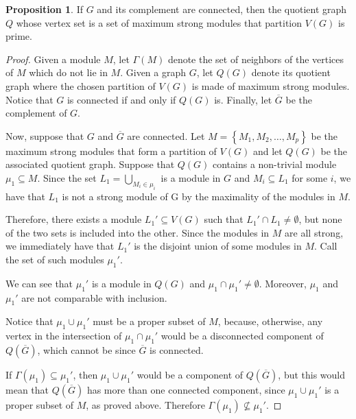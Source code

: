 \documentclass{article}
\theoremstyle{definition}
\newtheorem{prop}[thm]{Proposition}
\begin{document}
    \begin{prop} \label{prime quotient}
        If $G$ and its complement are connected, 
        then the quotient graph  $Q$ whose vertex set is
        a set of maximum strong modules that partition $V\left(G\right)$ is prime.
    \end{prop}
    \begin{proof}
        Given a module $M$, let $\Gamma\left(M\right)$ denote
        the set of neighbors of the vertices of $M$ 
        which do not lie in $M$.
        Given a graph  $G$, let  $Q\left(G\right)$ denote
        its quotient graph  where the chosen partition of
        $V\left(G\right)$ is made of maximum strong modules.
        Notice that $G$ is connected if and only if $Q\left(G\right)$ is.
        Finally, let $\overline{G}$ be the complement of $G$.

        Now, suppose that $G$ and $\overline{G}$ are connected.
        Let $M = \left\{M_1, M_2, \ldots, M_{p}\right\}$
        be the maximum strong modules that form a partition of $V\left(G\right)$
        and let $Q\left(G\right)$ be the associated quotient graph.
        Suppose that $Q\left(G\right)$ contains a non-trivial module
        $\mu_1 \subseteq M$. Since the set $L_1 = \bigcup_{M_{i} \in \mu_{i}}$
        is a module in $G$ and $M_{i} \subseteq L_1$ for some $i$,
        we have that $L_1$ is not a strong module of G
        by the maximality of the modules in $M$.

        Therefore, there exists a module $L_1' \subseteq V\left(G\right)$
        such that $L_1' \cap L_1 \neq \emptyset$, 
        but none of the two sets is included into the other.
        Since the modules in $M$ are all strong,
        we immediately have that $L_1'$ is the disjoint union of some modules in $M$.
        Call the set of such modules $\mu_1'$.

        We can see that $\mu_1'$ is a module in $Q\left(G\right)$ and 
        $\mu_1 \cap \mu_1' \neq \emptyset$.
        Moreover, $\mu_1$ and $\mu_1'$ are not comparable with inclusion.

        Notice that $\mu_1 \cup \mu_1'$ must be a proper subset of $M$,
        because, otherwise, any vertex in the intersection of
        $\mu_1 \cap \mu_1'$ would be a disconnected component of 
        $Q\left(\overline{G}\right)$,  which cannot be since 
        $\overline{G}$ is connected.

        If $\Gamma\left(\mu_1\right) \subseteq \mu_1'$, then $\mu_1 \cup \mu_1'$ 
        would be a component of $Q\left(\overline{G}\right)$,
        but this would mean that $Q\left(\overline{G}\right)$
        has more than one connected component,
        since $\mu_1 \cup \mu_1'$ is a proper subset
        of $M$, as proved above. Therefore $\Gamma\left(\mu_1\right) \not \subseteq \mu_1'$.


\end{proof}
\end{document}
